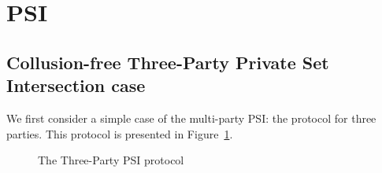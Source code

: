 \section{PSI}
\label{sec:psi}
\subsection{Collusion-free Three-Party Private Set Intersection case}
\label{sect:3psi-construction}
We first consider a simple case of the multi-party PSI: the protocol for three parties. This protocol is presented in Figure~\ref{fig:3psi}. 

\begin{figure}[h]\centering
{}
\caption{The Three-Party PSI protocol}
\label{fig:3psi}
\end{figure}